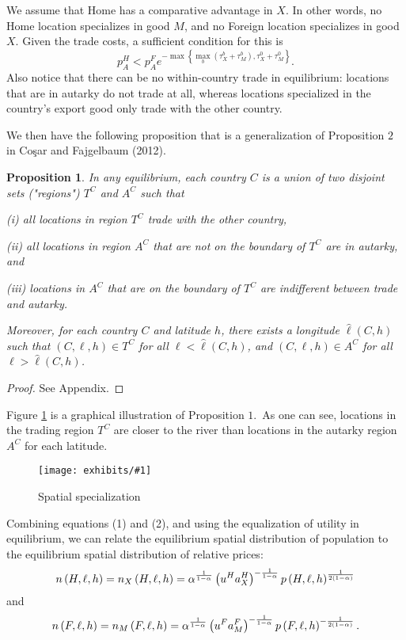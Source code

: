 \documentclass[12pt]{article}
\newtheorem{proposition}{Proposition}
\newcommand{\dofigure}[2]{\begin{figure}[h!]
\center %
\texttt{[image: exhibits/\#1]}
  \caption{#2\label{fig:#1}}
\end{figure}}
\begin{document}
We assume that Home has a comparative advantage in $X$. In other words, no Home location specializes in good $M$, and no Foreign
location specializes in good $X$. Given the trade costs, 
a sufficient condition for this is%
\begin{equation*}
p_{A}^{H}<p_{A}^{F}e^{-\max \left \{ \max_{b}\left( \tau _{X}^{b}+\tau
_{M}^{b}\right) ,\tau _{X}^{0}+\tau _{M}^{0}\right \} }.
\end{equation*}%
Also notice that there can be no within-country trade in equilibrium:
locations that are in autarky do not trade at all, whereas locations
specialized in the country's export good only trade with the other country.

We then have the following proposition that is a generalization of
Proposition $2$ in Co\c{s}ar and Fajgelbaum (2012).

\begin{proposition}
In any equilibrium, each country $C$ is a union of two disjoint sets
("regions") $T^{C}$ and $A^{C}$ such that

(i) all locations in region $T^{C}$ trade with the other country,

(ii) all locations in region $A^{C}$ that are not on the boundary of $T^{C}$
are in autarky, and

(iii) locations in $A^{C}$ that are on the boundary of $T^{C}$ are
indifferent between trade and autarky.

Moreover, for each country $C$ and latitude $h$, there exists a longitude $%
\widehat{\ell }\left( C,h\right) $ such that $\left( C,\ell ,h\right) \in
T^{C}$ for all $\ell <\widehat{\ell }\left( C,h\right) $, and $\left( C,\ell
,h\right) \in A^{C}$ for all $\ell >\widehat{\ell }\left( C,h\right) $.
\end{proposition}

\begin{proof}
See Appendix.
\end{proof}

Figure \ref{fig:figurem2} is a graphical illustration of Proposition $1$.\
As one can see, locations in the trading region $T^{C}$ are closer to the
river than locations in the autarky region $A^{C}$ for each latitude.

\dofigure{figurem2}{Spatial specialization}

Combining equations (1) and (2), and using the equalization of utility in
equilibrium, we can relate the equilibrium spatial distribution of
population to the equilibrium spatial distribution of relative prices:%
\begin{equation}
n\left( H,\ell ,h\right) =n_{X}\left( H,\ell ,h\right) =\alpha ^{\frac{1}{%
1-\alpha }}\left( u^{H}a_{X}^{H}\right) ^{-\frac{1}{1-\alpha }}p\left(
H,\ell ,h\right) ^{\frac{1}{2\left( 1-\alpha \right) }}
\end{equation}%
and%
\begin{equation}
n\left( F,\ell ,h\right) =n_{M}\left( F,\ell ,h\right) =\alpha ^{\frac{1}{%
1-\alpha }}\left( u^{F}a_{M}^{F}\right) ^{-\frac{1}{1-\alpha }}p\left(
F,\ell ,h\right) ^{-\frac{1}{2\left( 1-\alpha \right) }}.
\end{equation}
\end{document}
